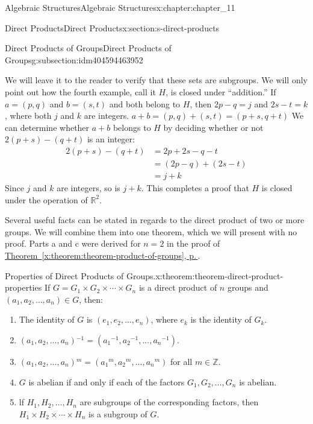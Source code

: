 \documentclass[twoside,10pt,]{book}
\newcommand{\xreffont}{\relax}
\numberwithin{equation}{section}
\begin{document}
\begin{chapterptx}{Algebraic Structures}{}{Algebraic Structures}{}{}{x:chapter:chapter_11}
\begin{sectionptx}{Direct Products}{}{Direct Products}{}{}{x:section:s-direct-products}
\begin{subsectionptx}{Direct Products of Groups}{}{Direct Products of Groups}{}{}{g:subsection:idm404594463952}
%
\par
We will leave it to the reader to verify that these sets are subgroups. We will only point out how the fourth example, call it \(H\), is closed under ``addition.'' If \(a = (p, q)\) and \(b = (s, t)\) and both belong to \(H\), then \(2p - q = j\) and \(2s - t= k\), where both \(j\) and \(k\) are integers.  \(a + b = (p, q) + (s, t) = (p + s, q + t)\) We can determine whether \(a + b\) belongs to \(H\) by deciding whether or not \(2(p + s) - (q + t)\) is an integer:%
\begin{equation*}
\begin{split}
2(p + s) - (q + t) &= 2p + 2s - q - t\\
& = (2p - q) + (2s - t) \\
& = j + k
\end{split}
\end{equation*}
Since \(j\) and \(k\) are integers, so is \(j +k\). This completes a proof that \(H\) is closed under the operation of  \(\mathbb{R}^2\).%
\par
Several useful facts can be stated in regards to the direct product of two or more groups. We will combine them into one theorem, which we will present with no proof. Parts a and c were derived for \(n = 2\) in the proof of \hyperref[x:theorem:theorem-product-of-groups]{Theorem~{\xreffont\ref{x:theorem:theorem-product-of-groups}}, p.\,\pageref{x:theorem:theorem-product-of-groups}}.%
\begin{theorem}{Properties of Direct Products of Groups.}{}{x:theorem:theorem-direct-product-properties}%
If \(G = G_1\times  G_2 \times  \cdots  \times  G_n\) is a direct product of \(n\) groups and \(\left(a_1,
a_2 , \dots , a_n\right) \in  G\), then:%
\begin{enumerate}[label=(\alph*)]
\item{}The identity of \(G\) is \(\left(e_1, e_2 , . . . , e_n\right)\), where \(e_k\) is the identity of \(G_k\).%
\item{}\(\left(a_1, a_2 , . . . , a_n\right) {}^{-1}= \left(a_1{}^{-1}, a_2{}^{-1} , . . . , a_n{}^{-1}\right)\).%
\item{}\(\left(a_1, a_2 , . . . , a_n\right) {}^m= \left(a_1{}^m, a_2{}^m , . . . , a_n{}^m\right)\) for all \(m\in \mathbb{Z}\).%
\item{}\(G\) is abelian if and only if each of the factors \(G_1, G_2, \ldots , G_n\) is abelian.%
\item{}lf \(H_1, H_2, \ldots , H_n\) are subgroups of the corresponding factors, then \(H_1\times  H_2 \times  \cdots  \times  H_n\) is a subgroup of \(G\).%

\end{enumerate}
\end{theorem}
\end{subsectionptx}
\end{sectionptx}
\end{chapterptx}
\end{document}
